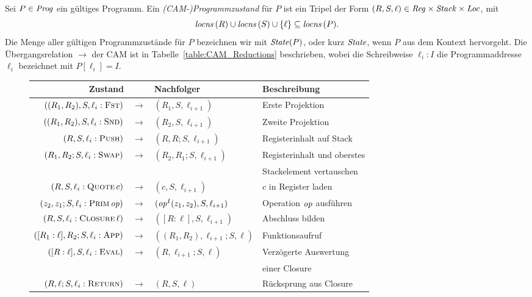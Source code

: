 \documentclass[12pt,fleqn]{article}
\begin{document}
\begin{definition}
  Sei $P\in{\text{\it Prog\/}}$ ein g\"ultiges Programm. Ein {\em (CAM-)Programmzustand} f\"ur $P$ ist ein Tripel der Form
  $(R,S,\ell) \in {\text{\it Reg\/}} \times {\text{\it Stack\/}} \times {\text{\it Loc\/}}$, mit
  \[
  {\text{\it locns\/}}\,(R)\cup{\text{\it locns\/}}\,(S)\cup\{\ell\}\subseteq{\text{\it locns\/}}\,(P).
  \]
  Die Menge aller g\"ultigen Programmzust\"ande f\"ur $P$ bezeichnen wir mit ${\text{\it State\/}}(P)$, oder kurz ${\text{\it State\/}}$,
  wenn $P$ aus dem Kontext hervorgeht. Die \"Ubergangsrelation $\to$ der CAM ist in 
  Tabelle~\ref{table:CAM_Reductions} beschrieben, wobei die Schreibweise $\ell_i:I$ die Programmaddresse
  $\ell_i$ bezeichnet mit $P[\ell_i] = I$.
\end{definition}

\begin{figure}
  {\footnotesize
  \begin{center}
    \begin{tabular}{|rcl|l|}
      \hline
      Zustand \hfill \quad && Nachfolger & Beschreibung \\
      \hline
      $((R_1,R_2),S,\ell_i:\textsc{Fst})$ & $\to$ & $(R_1,S,\ell_{i+1})$ & Erste Projektion \\
      $((R_1,R_2),S,\ell_i:\textsc{Snd})$ & $\to$ & $(R_2,S,\ell_{i+1})$ & Zweite Projektion \\
      \hline
      $(R,S,\ell_i:\textsc{Push})$ & $\to$ & $(R,R;S,\ell_{i+1})$ & Registerinhalt auf Stack \\
      $(R_1,R_2;S,\ell_i:\textsc{Swap})$ & $\to$ & $(R_2,R_1;S,\ell_{i+1})$ & Registerinhalt und oberstes \\
      &&& Stackelement vertauschen \\
      \hline
      $(R,S,\ell_i:\textsc{Quote}\,c)$ & $\to$ & $(c,S,\ell_{i+1})$ & $c$ in Register laden \\
      $(z_2,z_1;S,\ell_i:\textsc{Prim}\,{\text{\it op\/}})$ & $\to$ & $({\text{\it op\/}}^I(z_1,z_2),S,\ell_{i+1})$ & Operation ${\text{\it op\/}}$ ausf\"uhren \\
      $(R,S,\ell_i:\textsc{Closure}\,\ell)$ & $\to$ & $([R:\ell],S,\ell_{i+1})$ & Abschluss bilden \\
      \hline
      $([R_1:\ell],R_2;S,\ell_i:\textsc{App})$ & $\to$ & $((R_1,R_2),\ell_{i+1};S,\ell)$ & Funktionsaufruf \\
      $([R:\ell],S,\ell_i:\textsc{Eval})$ & $\to$ & $(R,\ell_{i+1};S,\ell)$ & Verz\"ogerte Auswertung \\
      &&& einer Closure \\
      $(R,\ell;S,\ell_i:\textsc{Return})$ & $\to$ & $(R,S,\ell)$ & R\"ucksprung aus Closure \\

\end{tabular}
\end{center}}
\end{figure}
\end{document}
